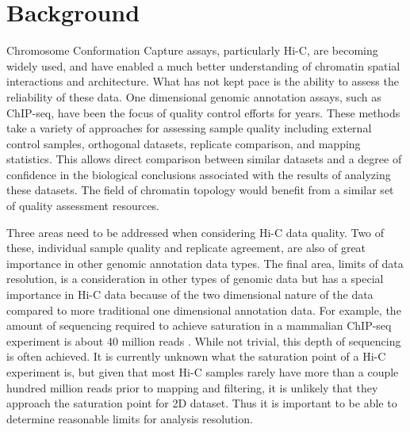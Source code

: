 \section{Background}

Chromosome Conformation Capture assays, particularly Hi-C, are becoming widely used, and have enabled a much better understanding of chromatin spatial interactions and architecture. What has not kept pace is the ability to assess the reliability of these data. One dimensional genomic annotation assays, such as ChIP-seq, have been the focus of quality control efforts for years\cite{landt_chip-seq_2012,planet_htseqtools:_2012,diaz_chance:_2012, carroll_impact_2014,marinov_large-scale_2014,qin_chilin:_2016}. These methods take a variety of approaches for assessing sample quality including external control samples, orthogonal datasets, replicate comparison, and mapping statistics. This allows direct comparison between similar datasets and a degree of confidence in the biological conclusions associated with the results of analyzing these datasets. The field of chromatin topology would benefit from a similar set of quality assessment resources.

Three areas need to be addressed when considering Hi-C data quality. Two of these, individual sample quality and replicate agreement, are also of great importance in other genomic annotation data types. The final area, limits of data resolution, is a consideration in other types of genomic data but has a special importance in Hi-C data because of the two dimensional nature of the data compared to more traditional one dimensional annotation data. For example, the amount of sequencing required to achieve saturation in a mammalian ChIP-seq experiment is about 40 million reads \cite{jung_impact_2014}. While not trivial, this depth of sequencing is often achieved. It is currently unknown what the saturation point of a Hi-C experiment is, but given that most Hi-C samples rarely have more than a couple hundred million reads prior to mapping and filtering, it is unlikely that they approach the saturation point for 2D dataset. Thus it is important to be able to determine reasonable limits for analysis resolution.

